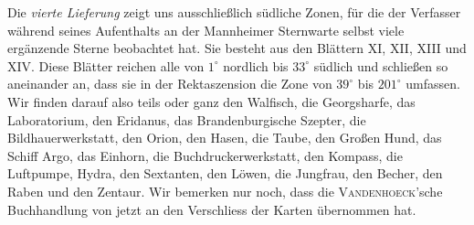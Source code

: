 \newpage
Die \emph{vierte Lieferung} zeigt uns ausschließlich südliche Zonen, für die der Verfasser während seines Aufenthalts an der Mannheimer Sternwarte selbst viele ergänzende Sterne beobachtet hat. Sie besteht aus den Blättern XI, XII, XIII und XIV. Diese Blätter reichen alle von $1^\circ$ nordlich bis $33^\circ$ südlich und schließen so aneinander an, dass sie in der Rektaszension die Zone von $39^\circ$ bis $201^\circ$ umfassen. Wir finden darauf also teils oder ganz den Walfisch, die Georgsharfe, das Laboratorium, den Eridanus, das Brandenburgische Szepter, die Bildhauerwerkstatt, den Orion, den Hasen, die Taube, den Großen Hund, das Schiff Argo, das Einhorn, die Buchdruckerwerkstatt, den Kompass, die Luftpumpe, Hydra, den Sextanten, den Löwen, die Jungfrau, den Becher, den Raben und den Zentaur. Wir bemerken nur noch, dass die \textsc{Vandenhoeck}'sche Buchhandlung von jetzt an den Verschliess der Karten übernommen hat.
